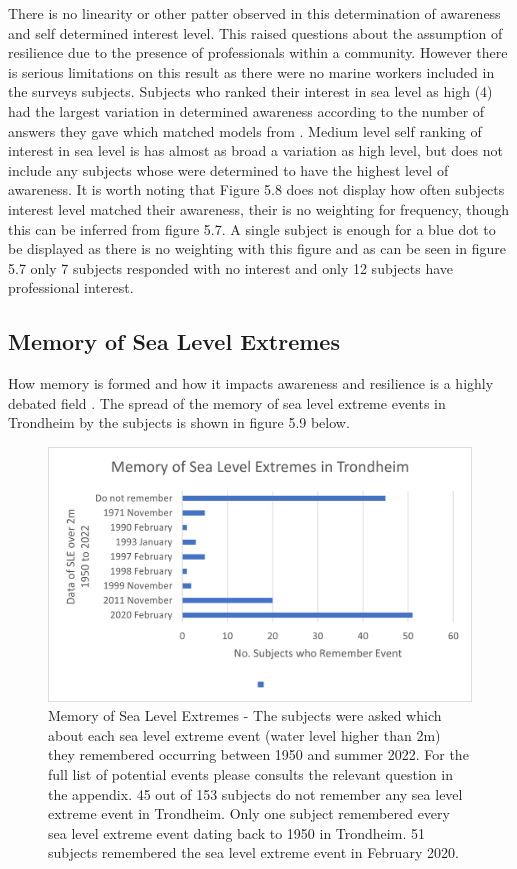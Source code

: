 There is no linearity or other patter observed in this determination of awareness and self determined interest level. This raised questions about the assumption of resilience due to the presence of professionals within a community. However there is serious limitations on this result as there were no marine workers included in the surveys subjects. Subjects who ranked their interest in sea level as high (4) had the largest variation in determined awareness according to the number of answers they gave which matched models from \cite{kartverket_se_2020}. Medium level self ranking of interest in sea level is has almost as broad a variation as high level, but does not include any subjects whose were determined to have the highest level of awareness. It is worth noting  that Figure 5.8 does not display how often subjects interest level matched their awareness, their is no weighting for frequency, though this can be inferred from figure 5.7. A single subject is enough for a blue dot to be displayed as there is no weighting with this figure and as can be seen in figure 5.7 only 7 subjects responded with no interest and only 12 subjects have professional interest. 



\subsection{Memory of Sea Level Extremes}
How memory is formed and how it impacts awareness and resilience is a highly debated field \cite{de_guttry_expiry_2022}. The spread of the memory of sea level extreme events in Trondheim by the subjects is shown in figure 5.9 below.

\begin{figure}[h!]
    \centering
    \includegraphics{fig_results/memory-sle.png}
    \caption{Memory of Sea Level Extremes - The subjects were asked which about each sea level extreme event (water level higher than 2m) they remembered occurring between 1950 and summer 2022. For the full list of potential events please consults the relevant question in the appendix. 45 out of 153 subjects do not remember any sea level extreme event in Trondheim. Only one subject remembered every sea level extreme event dating back to 1950 in Trondheim. 51 subjects remembered the sea level extreme event in February 2020. }
    \label{fig:my_label}
\end{figure}
